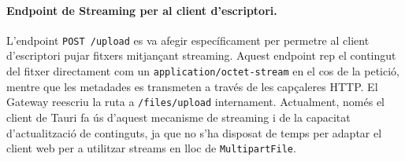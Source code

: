 \paragraph{Endpoint de Streaming per al client d'escriptori.} L'endpoint \texttt{POST /upload} es va afegir específicament per permetre al client d'escriptori pujar fitxers mitjançant streaming. Aquest endpoint rep el contingut del fitxer directament com un \texttt{application/octet-stream} en el cos de la petició, mentre que les metadades es transmeten a través de les capçaleres HTTP. El Gateway reescriu la ruta a \texttt{/files/upload} internament. Actualment, només el client de Tauri fa ús d'aquest mecanisme de streaming i de la capacitat d'actualització de continguts, ja que no s'ha disposat de temps per adaptar el client web per a utilitzar streams en lloc de \texttt{MultipartFile}.

